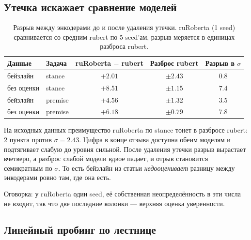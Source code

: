 \documentclass{article}
\begin{document}
\subsection{Утечка искажает сравнение моделей}

\begin{table}[!tbh]
\centering
\begin{tabular}{llccc}
\toprule
Данные & Задача & ruRoberta $-$ rubert & Разброс rubert & Разрыв в $\sigma$ \\
\midrule
бейзлайн   & stance  & $+2.01$ & $\pm 2.43$ & 0.8 \\
без оценки & stance  & $\mathbf{+8.51}$ & $\pm 1.15$ & $\mathbf{7.4}$ \\
бейзлайн   & premise & $+4.56$ & $\pm 1.32$ & 3.5 \\
без оценки & premise & $+6.18$ & $\pm 0.79$ & 7.8 \\
\bottomrule
\end{tabular}
\caption{Разрыв между энкодерами до и после удаления утечки. ruRoberta (1 seed)
сравнивается со средним rubert по 5 seed'ам, разрыв меряется в единицах разброса rubert.}
\label{tab:gap}
\end{table}

На исходных данных преимущество ruRoberta по stance тонет в разбросе rubert: 2 пункта
против $\sigma = 2.43$. Цифра в конце отзыва доступна обеим моделям и подтягивает слабую
до уровня сильной. После удаления утечки разрыв вырастает вчетверо, а разброс слабой модели
вдвое падает, и отрыв становится семикратным по $\sigma$. То есть бейзлайн из статьи
\emph{недооценивает} разницу между энкодерами ровно там, где она есть.

Оговорка: у ruRoberta один seed, её собственная неопределённость в эти числа не входит,
так что две последние колонки --- верхняя оценка уверенности.

\subsection{Линейный пробинг по лестнице}
\end{document}
